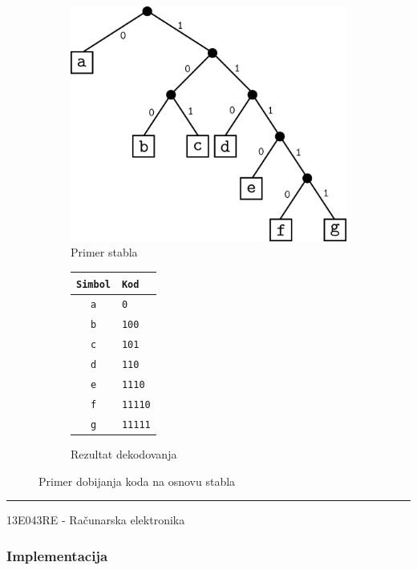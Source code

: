 \documentclass[a4paper, 12pt]{article}
\newcommand{\btmline}{
\vfill
\rule{0.9\textwidth}{0.4mm}
\begin{center}
13E043RE - Računarska elektronika
\end{center}}
\begin{document}
\begin{figure}[h!]
\centering
\begin{subfigure}{.45\textwidth}
	\centering
	\includegraphics[width=.95\linewidth]{codes}  
	\caption{Primer stabla}
\end{subfigure}
\begin{subfigure}{.45\textwidth}
	\centering
	\begin{tabular}{|c|l|}
	\hline
	\verb|Simbol|	& \verb|Kod|	 \\\hline
	\verb|a|		& \verb|0|		\\\hline
	\verb|b|		& \verb|100|	\\\hline
	\verb|c|		& \verb|101|	\\\hline
	\verb|d|		& \verb|110|	\\\hline
	\verb|e|		& \verb|1110|	\\\hline
	\verb|f|		& \verb|11110|	\\\hline
	\verb|g|		& \verb|11111|	\\\hline
	\end{tabular}
	\caption{Rezultat dekodovanja}
\end{subfigure}
\caption{Primer dobijanja koda na osnovu stabla}
\end{figure}




\btmline\newpage

\subsubsection*{Implementacija}
\end{document}
